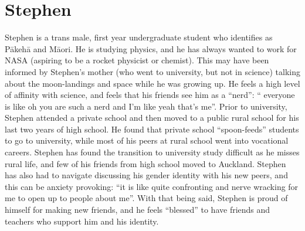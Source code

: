 \section*{Stephen}
Stephen is a trans male, first year undergraduate student who identifies as P\={a}keh\={a} and M\={a}ori. He is studying physics, and he has always wanted to work for NASA (aspiring to be a rocket physicist or chemist). This may have been informed by Stephen's mother (who went to university, but not in science) talking about the moon-landings and space while he was growing up. He feels a high level of affinity with science, and feels that his friends see him as a ``nerd'': `` everyone is like oh you are such a nerd and I’m like yeah that's me''. Prior to university, Stephen attended a private school and then moved to a public rural school for his last two years of high school. He found that private school ``spoon-feeds'' students to go to university, while most of his peers at rural school went into vocational careers. Stephen has found the transition to university study difficult as he misses rural life, and few of his friends from high school moved to Auckland. Stephen has also had to navigate discussing his gender identity with his new peers, and this can be anxiety provoking: ``it is like quite confronting and nerve wracking for me to open up to people about me''. With that being said, Stephen is proud of himself for making new friends, and he feels ``blessed'' to have friends and teachers who support him and his identity.  

